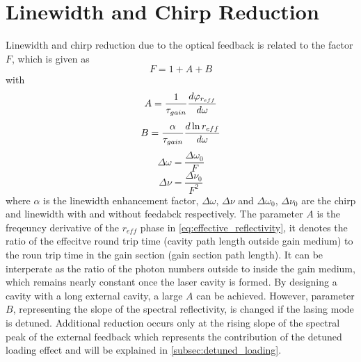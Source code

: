 \section{Linewidth and Chirp Reduction}\label{sec:linewidth_and_chirp_reduction}
Linewidth and chirp reduction due to the optical feedback is related to the factor $F$, which is given as \cite{kazarinov1987relation}
\begin{equation}
    F=1+A+B
    \label{eq:F_factor}
\end{equation}
with
\begin{equation}
    A=\frac{1}{\tau_{gain}}\dv{\varphi_{r_{eff}}}{\omega}
    \label{eq:F_factor_A}
\end{equation}
\begin{equation}
    B=\frac{\alpha}{\tau_{gain}}\dv{\ln{r_{eff}}}{\omega}
    \label{eq:F_factor_B}
\end{equation}
\begin{equation}
    \Delta\omega=\frac{\Delta\omega_0}{F}
    \label{eq:chirp_reduction}
\end{equation}
\begin{equation}
    \Delta\nu=\frac{\Delta\nu_0}{F^2}
    \label{eq:linewidth_reduction}
\end{equation}
where $\alpha$ is the linewidth enhancement factor, $\Delta\omega$, $\Delta\nu$ and $\Delta\omega_0$, $\Delta\nu_0$ are the chirp and linewidth with and without feedabck respectively. The parameter $A$ is the freqeuncy derivative of the $r_{eff}$ phase in \autoref{eq:effective_reflectivity}, it denotes the ratio of the effecitve round trip time (cavity path length outside gain medium) to the roun trip time in the gain section (gain section path length). It can be interperate as the ratio of the photon numbers outside to inside the gain medium, which remains nearly constant once the laser cavity is formed. By designing a cavity with a long external cavity, a large $A$ can be achieved. However, parameter $B$, representing the slope of the spectral reflectivity, is changed if the lasing mode is detuned. Additional reduction occurs only at the rising slope of the spectral peak of the external feedback which represents the contribution of the detuned loading effect and will be explained in \autoref{subsec:detuned_loading}.


